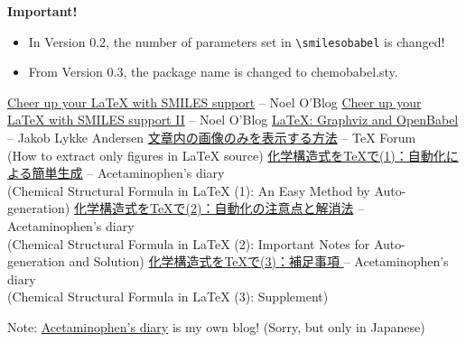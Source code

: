 \documentclass[12pt]{jsarticle}
\begin{document}
\textbf{Important!}
\begin{itemize}
\item In Version 0.2, the number of parameters set in \verb|\smilesobabel| is changed!
\item From Version 0.3, the package name is changed to \textsf{chemobabel.sty}.
\end{itemize}

\begin{thebibliography}{9}
\href{http://baoilleach.blogspot.jp/2012/03/cheer-up-your-latex-with-smiles-support.html}{Cheer up your LaTeX with SMILES support} -- Noel O'Blog
\href{http://baoilleach.blogspot.jp/2012/04/cheer-up-your-latex-with-smiles-support.html}{Cheer up your LaTeX with SMILES support II} -- Noel O'Blog
\href{http://imada.sdu.dk/~jlandersen/}{LaTeX: Graphviz and OpenBabel} -- Jakob Lykke Andersen
\href{http://oku.edu.mie-u.ac.jp/tex/mod/forum/discuss.php?d=1411}{文章内の画像のみを表示する方法} -- TeX Forum \\
(How to extract only figures in {\LaTeX} source)
\href{http://acetaminophen.hatenablog.com/entry/2014/11/02/130624}{化学構造式をTeXで(1)：自動化による簡単生成} -- Acetaminophen's diary \\
(Chemical Structural Formula in LaTeX (1): An Easy Method by Auto-generation)
\href{http://acetaminophen.hatenablog.com/entry/2014/11/02/130624}{化学構造式をTeXで(2)：自動化の注意点と解消法} -- Acetaminophen's diary \\
(Chemical Structural Formula in LaTeX (2): Important Notes for Auto-generation and Solution)
\href{http://acetaminophen.hatenablog.com/entry/2014/11/05/135927}{化学構造式をTeXで(3)：補足事項 } -- Acetaminophen's diary \\
(Chemical Structural Formula in LaTeX (3): Supplement)
\end{thebibliography}
Note: \href{http://acetaminophen.hatenablog.com/}{Acetaminophen's diary} is my own blog! (Sorry, but only in Japanese)
\end{document}
